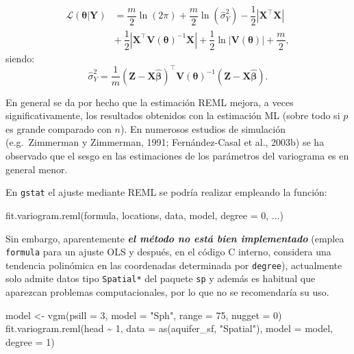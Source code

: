 \documentclass[
  spanish,
]{book}
\newenvironment{Shaded}{\begin{snugshade}}{\end{snugshade}}
\newcommand{\AttributeTok}[1]{\textcolor[rgb]{0.77,0.63,0.00}{#1}}
\newcommand{\DecValTok}[1]{\textcolor[rgb]{0.00,0.00,0.81}{#1}}
\newcommand{\FunctionTok}[1]{\textcolor[rgb]{0.00,0.00,0.00}{#1}}
\newcommand{\NormalTok}[1]{#1}
\newcommand{\OtherTok}[1]{\textcolor[rgb]{0.56,0.35,0.01}{#1}}
\newcommand{\SpecialCharTok}[1]{\textcolor[rgb]{0.00,0.00,0.00}{#1}}
\newcommand{\StringTok}[1]{\textcolor[rgb]{0.31,0.60,0.02}{#1}}
\theoremstyle{break}
\theoremstyle{definition}
\theoremstyle{definition}
\theoremstyle{definition}
\theoremstyle{definition}
\theoremstyle{remark}
\begin{document}
\[\begin{aligned}
\mathcal{L}(\boldsymbol{\theta}\left| \mathbf{Y}\right. ) 
& = \dfrac{m}{2} \ln (2\pi ) + \dfrac{m}{2} \ln (\hat{\sigma}_{Y}^2) -\dfrac{1}{2} \left| \mathbf{X}^\top\mathbf{X}\right|  \\
& + \ \dfrac{1}{2} \left| \mathbf{X}^\top\mathbf{V}(\boldsymbol{\theta})^{-1}
\mathbf{X}\right| +\dfrac{1}{2} \ln \left| \mathbf{V}(\boldsymbol{\theta})\right|
+\dfrac{m}{2} ,\end{aligned}\]
siendo:
\[\hat{\sigma }_{Y}^2 =\dfrac{1}{m}(\mathbf{Z}-\mathbf{X}\hat{\boldsymbol{\beta}}
)^\top \mathbf{V}(\boldsymbol{\theta})^{-1}(\mathbf{Z}-\mathbf{X}\hat{\boldsymbol{\beta}}).\]

En general se da por hecho que la estimación REML mejora, a veces significativamente, los resultados obtenidos con la estimación ML (sobre todo si \(p\) es grande comparado con \(n\)).
En numerosos estudios de simulación (e.g.~Zimmerman y Zimmerman, 1991; Fernández-Casal et al., 2003b) se ha observado que el sesgo en las estimaciones de los parámetros del variograma es en general menor.

En \texttt{gstat} el ajuste mediante REML se podría realizar empleando la función:

\begin{Shaded}
\begin{Highlighting}[]
\FunctionTok{fit.variogram.reml}\NormalTok{(formula, locations, data, model, }\AttributeTok{degree =} \DecValTok{0}\NormalTok{, ...)}
\end{Highlighting}
\end{Shaded}

Sin embargo, aparentemente \textbf{\emph{el método no está bien implementado}} (emplea \texttt{formula} para un ajuste OLS y después, en el código C interno, considera una tendencia polinómica en las coordenadas determinada por \texttt{degree}), actualmente solo admite datos tipo \texttt{Spatial*} del paquete \texttt{sp} y además es habitual que aparezcan problemas computacionales, por lo que no se recomendaría su uso.

\begin{Shaded}
\begin{Highlighting}[]
\NormalTok{model }\OtherTok{\textless{}{-}} \FunctionTok{vgm}\NormalTok{(}\AttributeTok{psill =} \DecValTok{3}\NormalTok{, }\AttributeTok{model =} \StringTok{"Sph"}\NormalTok{, }\AttributeTok{range =} \DecValTok{75}\NormalTok{, }\AttributeTok{nugget =} \DecValTok{0}\NormalTok{)}
\FunctionTok{fit.variogram.reml}\NormalTok{(head }\SpecialCharTok{\textasciitilde{}} \DecValTok{1}\NormalTok{, }\AttributeTok{data =} \FunctionTok{as}\NormalTok{(aquifer\_sf, }\StringTok{"Spatial"}\NormalTok{), }\AttributeTok{model =}\NormalTok{ model, }\AttributeTok{degree =} \DecValTok{1}\NormalTok{)}
\end{Highlighting}
\end{Shaded}
\end{document}
